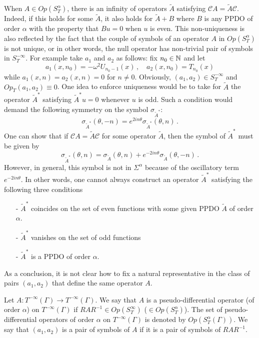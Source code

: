 \documentclass[a4paper]{article}
\begin{document}
\begin{Rem}
	When $A \in \textit{Op}(S^\alpha_T)$, there is an infinity of operators $\tilde{A}$ satisfying $\mathcal{C}A = \tilde{A} \mathcal{C}$. Indeed, if this holds for some $\tilde{A}$, it also holds for $\tilde{A} + B$ where $B$ is any PPDO of order $\alpha$ with the property that $Bu = 0$ when $u$ is even. This non-uniqueness is also reflected by the fact that the couple of symbols of an operator $A$ in $\textit{Op}(S^\alpha_T)$ is not unique, or in other words, the null operator has non-trivial pair of symbols in $S^{-\infty}_T$. For example take $a_1$ and $a_2$ as follows: fix $n_0 \in \mathbb{N}$ and let 
	\[a_1(x,n_0) = -\omega^2 U_{n_0-1}(x)\,, \quad a_2(x,n_0) = T_{n_0}(x)\]
	while $a_1(x,n) = a_2(x,n) = 0$ for $n \neq 0$. Obviously, $(a_1,a_2) \in S^{-\infty}_T$ and $\textit{Op}_T(a_1,a_2) \equiv 0$. 
	One idea to enforce uniqueness would be to take for $\tilde{A}$ the operator $\tilde{A}^*$ satisfying $\tilde{A}^*u = 0$ whenever $u$ is odd. Such a condition would demand the following symmetry on the symbol $\sigma_{\tilde{A}^*}:$
	\[\sigma_{\tilde{A}^*}(\theta,-n) = e^{2in\theta}\sigma_{\tilde{A}^*}(\theta,n)\,.\]
	One can show that if $\mathcal{C}A = \tilde{A} \mathcal{C}$ for some operator $\tilde{A}$, then the symbol of $\tilde{A}^*$ must be given by
	\[\sigma_{\tilde{A}^*}(\theta,n) = \sigma_{\tilde{A}}(\theta,n) + e^{-2in\theta}\sigma_{\tilde{A}}(\theta,-n)\,.\] 
	However, in general, this symbol is not in $\Sigma^\alpha$ because of the oscillatory term $e^{-2in\theta}$. In other words, one cannot always construct an operator $\tilde{A}^*$  satisfying the following three conditions 
	\begin{itemize}
		\item[-] $\tilde{A}^*$ coincides on the set of even functions with some given PPDO $\tilde{A}$ of order $\alpha$.
		\item[-] $\tilde{A}^*$ vanishes on the set of odd functions
		\item[-] $\tilde{A}^*$ is a PPDO of order $\alpha$. 
	\end{itemize}
	As a conclusion, it is not clear how to fix a natural representative in the class of pairs $(a_1,a_2)$ that define the same operator $A$. 
\end{Rem}
\begin{Def}
	Let $A : T^{-\infty}(\Gamma) \to T^{-\infty}(\Gamma)$. We say that $A$ is a pseudo-differential operator (of order $\alpha$) on $T^{-\infty}(\Gamma)$ if $R A R^{-1} \in Op(S^{\infty}_T)$ ($\in Op(S_T^{\alpha})$). The set of pseudo-differential operators of order $\alpha$ on $T^{-\infty}(\Gamma)$ is denoted by $\textit{Op}(S^{\alpha}_T(\Gamma))$. We say that $(a_1,a_2)$ is a pair of symbols of $A$ if it is a pair of symbols of $RAR^{-1}$.  
\end{Def}
\end{document}
